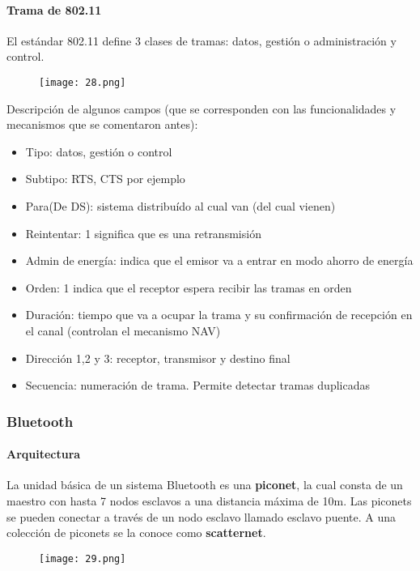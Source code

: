 \documentclass{book}
\begin{document}
	\paragraph{Trama de 802.11}
	El estándar 802.11 define 3 clases de tramas: datos, gestión o administración y control.
	
	\begin{figure}[H]
		\centering
		\texttt{[image: 28.png]}
	\end{figure}
	
	Descripción de algunos campos (que se corresponden con las funcionalidades y mecanismos que se comentaron antes):
	
	\begin{itemize}
		\item Tipo: datos, gestión o control
		\item Subtipo: RTS, CTS por ejemplo
		\item Para(De DS): sistema distribuído al cual van (del cual vienen)
		\item Reintentar: 1 significa que es una retransmisión
		\item Admin de energía: indica que el emisor va a entrar en modo ahorro de energía
		\item Orden: 1 indica que el receptor espera recibir las tramas en orden
		\item Duración: tiempo que va a ocupar la trama y su confirmación de recepción en el canal (controlan el mecanismo NAV)
		\item Dirección 1,2 y 3: receptor, transmisor y destino final
		\item Secuencia: numeración de trama. Permite detectar tramas duplicadas
	\end{itemize}
	
	\subsubsection{Bluetooth}
	\paragraph{Arquitectura}
	La unidad básica de un sistema Bluetooth es una \textbf{piconet}, la cual consta de un maestro con hasta 7 nodos esclavos a una distancia máxima de 10m. Las piconets se pueden conectar a través de un nodo esclavo llamado esclavo puente. A una colección de piconets se la conoce como \textbf{scatternet}.
	
	\begin{figure}[H]
		\centering
		\texttt{[image: 29.png]}
	\end{figure}
	
\end{document}
